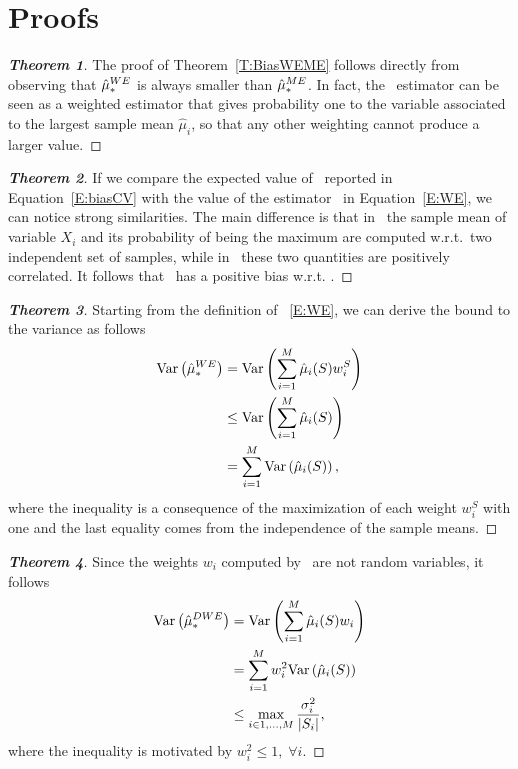 \section{Proofs}\label{A:Proofs}
\begin{proof}[\textbf{Theorem 1}]
The proof of Theorem~\ref{T:BiasWEME} follows directly from observing that $\hat\mu_*^{WE}$ is always smaller than $\hat\mu_*^{ME}$. In fact, the \ME~estimator can be seen as a weighted estimator that gives probability one to the variable associated to the largest sample mean $\hat\mu_i$, so that any other weighting cannot produce a larger value. 
\end{proof}

\begin{proof}[\textbf{Theorem 2}]
  If we compare the expected value of \CV~reported in Equation~\eqref{E:biasCV} with the value of the  estimator \WE~in Equation~\eqref{E:WE}, we can notice strong similarities.
  The main difference is that in \CV~the sample mean of variable $X_i$ and its probability of being the maximum are computed w.r.t.~two independent set of samples, while in \WE~these two quantities are positively correlated. It follows that \WE~has a positive bias w.r.t. \CV.
\end{proof}

\begin{proof}[\textbf{Theorem 3}]
 Starting from the definition of \WE~\eqref{E:WE}, we can derive the bound to the variance as follows
 \begin{align*}
  \mathrm{Var}\left(\hat\mu_*^{WE}\right) &= \mathrm{Var}\left(\sum_{i=1}^M \hat\mu_i(S) w_i^S\right)\\
  &\leq \mathrm{Var}\left(\sum_{i=1}^M \hat\mu_i(S)\right)\\
  &= \sum_{i=1}^M \mathrm{Var}\left(\hat\mu_i(S)\right),
 \end{align*}
 where the inequality is a consequence of the maximization of each weight $w_i^S$ with one and the last equality comes from the independence of the sample means.
\end{proof}

\begin{proof}[\textbf{Theorem 4}]
 Since the weights $w_i$ computed by \OWE~are not random variables, it follows
 \begin{align*}
  \mathrm{Var}\left(\hat\mu_*^{DWE}\right) &= \mathrm{Var}\left(\sum_{i=1}^M \hat\mu_i(S) w_i\right)\\
  &= \sum_{i=1}^M w_i^2\mathrm{Var}\left(\hat\mu_i(S)\right)\\
  &\leq \max_{i\in{1,\dots,M}} \frac{\sigma^2_i}{|S_i|},
 \end{align*}
 where the inequality is motivated by $w_i^2\leq 1,\;\forall i.$
\end{proof}


